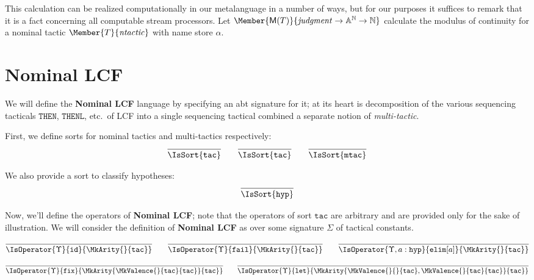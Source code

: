 This calculation can be realized computationally in our metalanguage in a
number of ways, but for our purposes it suffices to remark that it is a fact
concerning all computable stream processors. Let
$\Member{\ModC{T}}{\LCFJudgment\to\MLStream{\MLAtom}\to\MLNat}$ calculate the
modulus of continuity for a nominal tactic $\Member{T}{\LCFNominalTactic}$ with
name store $\alpha$.

\section{Nominal LCF}

\newcommand\SortTac{\mathtt{tac}}
\newcommand\SortMTac{\mathtt{mtac}}
\newcommand\SortHyp{\mathtt{hyp}}

We will define the \textbf{Nominal LCF} language by specifying an abt signature
for it; at its heart is decomposition of the various sequencing tacticals
$\mathtt{THEN}$, $\mathtt{THENL}$, etc.\ of LCF into a single sequencing
tactical combined a separate notion of \emph{multi-tactic}.

First, we define sorts for nominal tactics and multi-tactics respectively:
\begin{gather*}
  \infer{
    \IsSort{\SortTac}
  }{}
  \qquad
  \infer{
    \IsSort{\SortTac}
  }{}
  \qquad
  \infer{
    \IsSort{\SortMTac}
  }{}
\end{gather*}

We also provide a sort to classify hypotheses:
\[
  \infer{
    \IsSort{\SortHyp}
  }{
  }
\]

Now, we'll define the operators of \textbf{Nominal LCF}; note that the
operators of sort $\SortTac$ are arbitrary and are provided only for the sake
of illustration. We will consider the definition of \textbf{Nominal LCF} as
over some signature $\Sigma$ of tactical constants.

\[
  \infer{
    \IsOperator{\Upsilon}{\mathtt{id}}{
      \MkArity{}{\SortTac}
    }
  }{
  }
  \qquad
  \infer{
    \IsOperator{\Upsilon}{\mathtt{fail}}{
      \MkArity{}{\SortTac}
    }
  }{
  }
  \qquad
  \infer{
    \IsOperator{\Upsilon,a:\SortHyp}{\mathtt{elim}[a]}{
      \MkArity{}{\SortTac}
    }
  }{
  }
\]

\[
  \infer{
    \IsOperator{\Upsilon}{\mathtt{fix}}{
      \MkArity{
        \MkValence{}{\SortTac}{\SortTac}
      }{\SortTac}
    }
  }{
  }
  \qquad
  \infer{
    \IsOperator{\Upsilon}{\mathtt{let}}{
      \MkArity{
        \MkValence{}{}{\SortTac},
        \MkValence{}{\SortTac}{\SortTac}
      }{\SortTac}
    }
  }{
  }
\]

